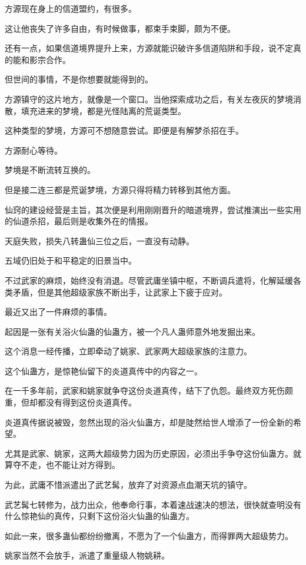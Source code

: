 \begin{this_body}
方源现在身上的信道盟约，有很多。

这让他丧失了许多自由，有时候做事，都束手束脚，颇为不便。

还有一点，如果信道境界提升上来，方源就能识破许多信道陷阱和手段，说不定真的能和影宗合作。

但世间的事情，不是你想要就能得到的。

方源镇守的这片地方，就像是一个窗口。当他探索成功之后，有关左夜灰的梦境消散，填充进来的梦境，都是光怪陆离的荒诞类型。

这种类型的梦境，方源可不想随意尝试。即便是有解梦杀招在手。

方源耐心等待。

梦境是不断流转互换的。

但是接二连三都是荒诞梦境，方源只得将精力转移到其他方面。

仙窍的建设经营是主旨，其次便是利用刚刚晋升的暗道境界，尝试推演出一些实用的仙道杀招，最后则是收集外在的情报。

天庭失败，损失八转蛊仙三位之后，一直没有动静。

五域仍旧处于和平稳定的旧景当中。

不过武家的麻烦，始终没有消退。尽管武庸坐镇中枢，不断调兵遣将，化解延缓各类矛盾，但是其他超级家族不断出手，让武家上下疲于应对。

最近又出了一件麻烦的事情。

起因是一张有关浴火仙蛊的仙蛊方，被一个凡人蛊师意外地发掘出来。

这个消息一经传播，立即牵动了姚家、武家两大超级家族的注意力。

这个仙蛊方，是惊艳仙留下的炎道真传中的内容之一。

在一千多年前，武家和姚家就争夺这份炎道真传，结下了仇怨。最终双方死伤颇重，但却都没有得到这份炎道真传。

炎道真传据说被毁，忽然出现的浴火仙蛊方，却是陡然给世人增添了一份全新的希望。

尤其是武家、姚家，这两大超级势力因为历史原因，必须出手争夺这份仙蛊方。就算夺不走，也不能让对方得到。

为此，武庸不惜派遣出了武艺髯，放弃了对资源点血潮天坑的镇守。

武艺髯七转修为，战力出众，他奉命行事，本着速战速决的想法，很快就查明没有什么惊艳仙的真传，只剩下这份浴火仙蛊的仙蛊方。

如此一来，很多蛊仙都纷纷撤离，不愿为了一个仙蛊方，而得罪两大超级势力。

姚家当然不会放手，派遣了重量级人物姚耕。


\end{this_body}

